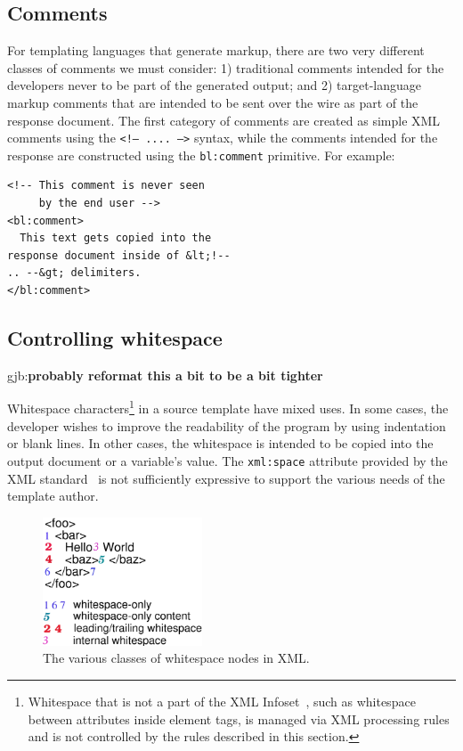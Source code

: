 \documentclass{www2003-submission}
\newcommand{\smtexttt}[1]{{\small\texttt{#1}}}
\newcommand{\gjb}[1]{{\sc gjb:}\textbf{#1}}
\begin{document}
\subsection{Comments}

For templating languages that generate markup, there are two very
different classes of comments we must consider: 1) traditional
comments intended for the developers never to be part of the generated
output; and 2) target-language markup comments that are intended to be
sent over the wire as part of the response document.  The first
category of comments are created as simple XML comments using the
\smtexttt{<!-- .... -->} syntax, while the comments intended for the
response are constructed using the \smtexttt{bl:comment} primitive.
For example:

\begin{verbatim}
<!-- This comment is never seen
     by the end user -->
<bl:comment>
  This text gets copied into the
response document inside of &lt;!--
.. --&gt; delimiters.
</bl:comment>
\end{verbatim}


\subsection{Controlling whitespace}

\gjb{probably reformat this a bit to be a bit tighter}

Whitespace characters\footnote{Whitespace that is not a part of the
XML Infoset~\cite{XML-infoset}, such as whitespace between attributes inside element
tags, is managed via XML processing rules and is not controlled by the
rules described in this section.} in a source template have mixed uses.  In some
cases, the developer wishes to improve the readability of the program
by using indentation or blank lines.  In other cases, the whitespace
is intended to be copied into the output document or a variable's
value.  The \smtexttt{xml:space} attribute provided by the XML
standard~\cite[2.10]{XML} is not sufficiently expressive to support
the various needs of the template author.

\begin{figure}[bt]
\begin{centering}
\includegraphics[height=1.5in]{etl-whitespace-rules.eps}
\caption{The various classes of whitespace nodes in XML. \label{fig-ws-rules}}
\end{centering}
\end{figure}
\end{document}
